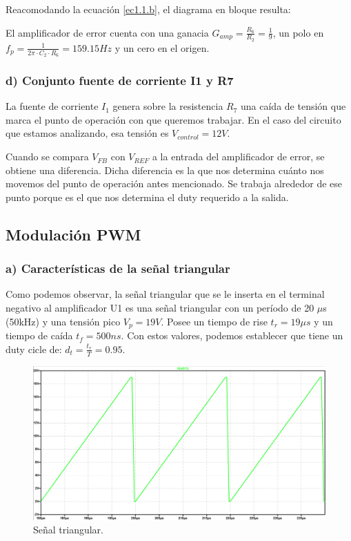\documentclass[e4_tp2_main.tex]{subfiles}
\begin{document}
Reacomodando la ecuaci\'on \eqref{ec1.1.b}, el diagrama en bloque resulta: 

\begin{center}
\end{center}


El amplificador de error cuenta con una ganacia $G_{amp}=\frac{R_6}{R_2} =\frac{1}{9}$, un polo en $f_p=\frac{1}{2 \pi \cdot C_2 \cdot R_6 }=159.15Hz$ y un cero en el origen.


\subsubsection*{d) Conjunto fuente de corriente I1 y R7}
La fuente de corriente $I_1$ genera sobre la resistencia $R_7$ una ca\'ida de tensi\'on que marca el punto de operaci\'on con que queremos trabajar. En el caso del circuito que estamos analizando, esa tensi\'on es $V_{control}=12V$. 

Cuando se compara $V_{FB}$ con $V_{REF}$ a la entrada del amplificador de error, se obtiene una diferencia. Dicha diferencia es la que nos determina cu\'anto nos movemos del punto de operaci\'on antes mencionado. Se trabaja alrededor de ese punto porque es el que nos determina el duty requerido a la salida.

\subsection{Modulaci\'on PWM}


\subsubsection*{a) Caracter\'isticas de la se\~nal triangular}
Como podemos observar, la señal triangular que se le inserta en el terminal negativo al amplificador U1 es una señal triangular con un período de 20 $\mu $s (50kHz) y una tensión pico $V_p=19 V$. Posee un tiempo de rise $t_r=19 \mu s$ y un tiempo de caída $t_f=500ns$. Con estos valores, podemos establecer que tiene un duty cicle de: $d_t= \frac{t_r}{T}=0.95$. 
\begin{figure}[H]
\centering
\includegraphics[width=0.5\linewidth]{Imagenes/Punto1/triang_shape.png}
\caption{Señal triangular.}
\end{figure}
\end{document}
